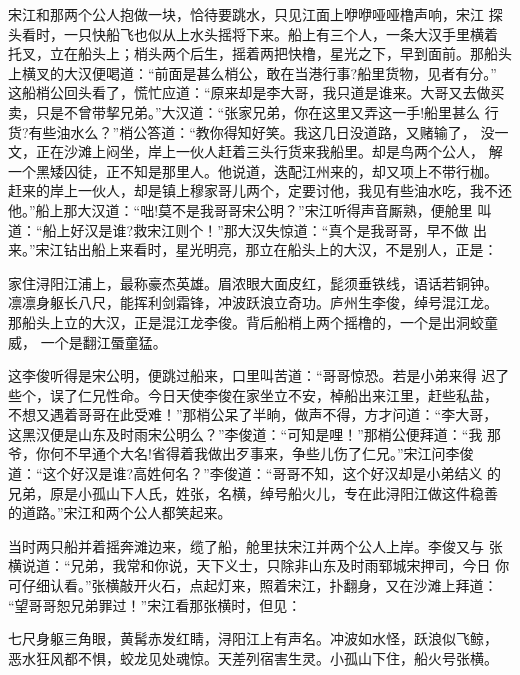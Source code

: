 宋江和那两个公人抱做一块，恰待要跳水，只见江面上咿咿哑哑橹声响，宋江
探头看时，一只快船飞也似从上水头摇将下来。船上有三个人，一条大汉手里横着
托叉，立在船头上；梢头两个后生，摇着两把快橹，星光之下，早到面前。那船头
上横叉的大汉便喝道：“前面是甚么梢公，敢在当港行事?船里货物，见者有分。”
这船梢公回头看了，慌忙应道：“原来却是李大哥，我只道是谁来。大哥又去做买
卖，只是不曾带挈兄弟。”大汉道：“张家兄弟，你在这里又弄这一手!船里甚么
行货?有些油水么？”梢公答道：“教你得知好笑。我这几日没道路，又赌输了，
没一文，正在沙滩上闷坐，岸上一伙人赶着三头行货来我船里。却是鸟两个公人，
解一个黑矮囚徒，正不知是那里人。他说道，迭配江州来的，却又项上不带行枷。
赶来的岸上一伙人，却是镇上穆家哥儿两个，定要讨他，我见有些油水吃，我不还
他。”船上那大汉道：“咄!莫不是我哥哥宋公明？”宋江听得声音厮熟，便舱里
叫道：“船上好汉是谁?救宋江则个！”那大汉失惊道：“真个是我哥哥，早不做
出来。”宋江钻出船上来看时，星光明亮，那立在船头上的大汉，不是别人，正是：

家住浔阳江浦上，最称豪杰英雄。眉浓眼大面皮红，髭须垂铁线，语话若铜钟。
凛凛身躯长八尺，能挥利剑霜锋，冲波跃浪立奇功。庐州生李俊，绰号混江龙。
那船头上立的大汉，正是混江龙李俊。背后船梢上两个摇橹的，一个是出洞蛟童威，
一个是翻江蜃童猛。

这李俊听得是宋公明，便跳过船来，口里叫苦道：“哥哥惊恐。若是小弟来得
迟了些个，误了仁兄性命。今日天使李俊在家坐立不安，棹船出来江里，赶些私盐，
不想又遇着哥哥在此受难！”那梢公呆了半晌，做声不得，方才问道：“李大哥，
这黑汉便是山东及时雨宋公明么？”李俊道：“可知是哩！”那梢公便拜道：“我
那爷，你何不早通个大名!省得着我做出歹事来，争些儿伤了仁兄。”宋江问李俊
道：“这个好汉是谁?高姓何名？”李俊道：“哥哥不知，这个好汉却是小弟结义
的兄弟，原是小孤山下人氏，姓张，名横，绰号船火儿，专在此浔阳江做这件稳善
的道路。”宋江和两个公人都笑起来。

当时两只船并着摇奔滩边来，缆了船，舱里扶宋江并两个公人上岸。李俊又与
张横说道：“兄弟，我常和你说，天下义士，只除非山东及时雨郓城宋押司，今日
你可仔细认看。”张横敲开火石，点起灯来，照着宋江，扑翻身，又在沙滩上拜道：
“望哥哥恕兄弟罪过！”宋江看那张横时，但见：

七尺身躯三角眼，黄髯赤发红睛，浔阳江上有声名。冲波如水怪，跃浪似飞鲸，
恶水狂风都不惧，蛟龙见处魂惊。天差列宿害生灵。小孤山下住，船火号张横。

